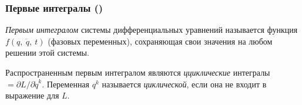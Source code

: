 \subsubsection*{Первые интегралы \textnormal{()}}

\begin{to_def} 
    \textit{Первым интегралом} системы дифференциальных уравнений называется функция $f(q,\ \dot{q}, \ t)$  (фазовых переменных), сохраняющая свои значения на любом решении этой системы.
\end{to_def}

\begin{to_def} 
    Распространенным первым интегралом являются \textit{цциклические} интегралы $= \partial L / \partial \dot{q}^k$. Переменная $q^k$ называется \textit{циклической}, если она не входит в выражение для $L$.  
\end{to_def}






